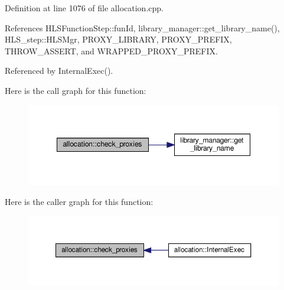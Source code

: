 Definition at line 1076 of file allocation.\+cpp.



References H\+L\+S\+Function\+Step\+::fun\+Id, library\+\_\+manager\+::get\+\_\+library\+\_\+name(), H\+L\+S\+\_\+step\+::\+H\+L\+S\+Mgr, P\+R\+O\+X\+Y\+\_\+\+L\+I\+B\+R\+A\+RY, P\+R\+O\+X\+Y\+\_\+\+P\+R\+E\+F\+IX, T\+H\+R\+O\+W\+\_\+\+A\+S\+S\+E\+RT, and W\+R\+A\+P\+P\+E\+D\+\_\+\+P\+R\+O\+X\+Y\+\_\+\+P\+R\+E\+F\+IX.



Referenced by Internal\+Exec().

Here is the call graph for this function\+:
\nopagebreak
\begin{figure}[H]
\begin{center}
\leavevmode
\includegraphics[width=348pt]{d0/d74/classallocation_a11a59e23f159e981fdb7d62446153267_cgraph}
\end{center}
\end{figure}
Here is the caller graph for this function\+:
\nopagebreak
\begin{figure}[H]
\begin{center}
\leavevmode
\includegraphics[width=350pt]{d0/d74/classallocation_a11a59e23f159e981fdb7d62446153267_icgraph}
\end{center}
\end{figure}
\mbox{\label{classallocation_a5aa6886382ebdc049a6bc4ef82225973}} 
